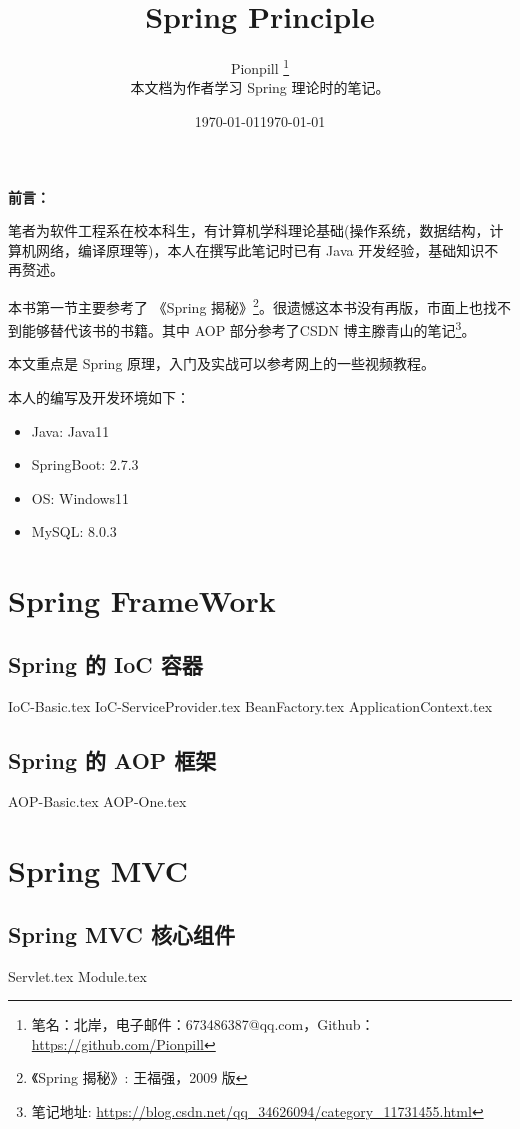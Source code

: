 \documentclass{PionpillNote-book}
\title{Spring Principle}
\author{
    Pionpill \footnote{笔名：北岸，电子邮件：673486387@qq.com，Github：\url{https://github.com/Pionpill}} \\
    本文档为作者学习 Spring 理论时的笔记。\\
}
\date{\today}
\begin{document}
\pagestyle{plain}
\maketitle

\noindent\textbf{前言：}

笔者为软件工程系在校本科生，有计算机学科理论基础(操作系统，数据结构，计算机网络，编译原理等)，本人在撰写此笔记时已有 Java 开发经验，基础知识不再赘述。

本书第一节主要参考了 《Spring 揭秘》\footnote{《Spring 揭秘》: 王福强，2009 版}。很遗憾这本书没有再版，市面上也找不到能够替代该书的书籍。其中 AOP 部分参考了CSDN 博主滕青山的笔记\footnote{笔记地址: \url{https://blog.csdn.net/qq_34626094/category_11731455.html}}。

本文重点是 Spring 原理，入门及实战可以参考网上的一些视频教程。

本人的编写及开发环境如下：
\begin{itemize}
    \item Java: Java11
    \item SpringBoot: 2.7.3
    \item OS: Windows11 
    \item MySQL: 8.0.3
\end{itemize}

\date{\today}
\newpage

\tableofcontents

\newpage

\setcounter{page}{1} 
\pagestyle{fancy}

\part{Spring FrameWork}
\chapter{Spring 的 IoC 容器}
{IoC-Basic.tex}
{IoC-ServiceProvider.tex}
{BeanFactory.tex}
{ApplicationContext.tex}
\chapter{Spring 的 AOP 框架}
{AOP-Basic.tex}
{AOP-One.tex}

\part{Spring MVC}
\chapter{Spring MVC 核心组件}
{Servlet.tex}
{Module.tex}
\end{document}
